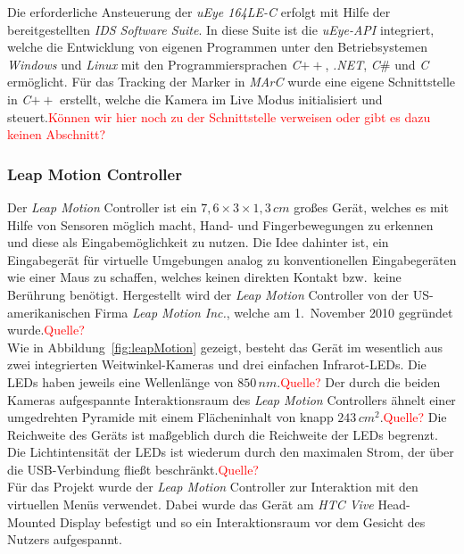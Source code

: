 Die erforderliche Ansteuerung der \textit{uEye 164LE-C} erfolgt mit Hilfe der bereitgestellten \textit{IDS Software Suite}. In diese Suite ist die \textit{uEye-API} integriert, welche die Entwicklung von eigenen Programmen unter den Betriebsystemen \textit{Windows} und \textit{Linux} mit den Programmiersprachen \textit{C}$++$, \textit{.NET}, \textit{C$\#$} und \textit{C} ermöglicht.\cite{website:IDSSuite} Für das Tracking der Marker in \textit{MArC} wurde eine eigene Schnittstelle in \textit{C}$++$ erstellt, welche die Kamera im Live Modus initialisiert und steuert.\textcolor{red}{Können wir hier noch zu der Schnittstelle verweisen oder gibt es dazu keinen Abschnitt?}

\subsubsection{Leap Motion Controller}\label{sec:LeapMotion} 	
Der \textit{Leap Motion} Controller \cite{website:LeapMotion} ist ein $7,6\times3\times1,3\,cm$ großes Gerät, welches es mit Hilfe von Sensoren möglich macht, Hand- und Fingerbewegungen zu erkennen und diese als Eingabemöglichkeit zu nutzen. Die Idee dahinter ist, ein Eingabegerät für virtuelle Umgebungen analog zu konventionellen Eingabegeräten wie einer Maus zu schaffen, welches keinen direkten Kontakt bzw.\ keine Berührung benötigt. Hergestellt wird der \textit{Leap Motion} Controller von der US-amerikanischen Firma \emph{Leap Motion Inc.}, welche am 1.\ November 2010 gegründet wurde.\textcolor{red}{Quelle?}\\
Wie in Abbildung~\ref{fig:leapMotion} gezeigt, besteht das Gerät im wesentlich aus zwei integrierten Weitwinkel-Kameras und drei einfachen Infrarot-LEDs. Die LEDs haben jeweils eine Wellenlänge von $850\,nm$.\textcolor{red}{Quelle?} Der durch die beiden Kameras aufgespannte Interaktionsraum des \textit{Leap Motion} Controllers ähnelt einer umgedrehten Pyramide mit einem Flächeninhalt von knapp $243\,cm{^2}$.\textcolor{red}{Quelle?} Die Reichweite des Geräts ist maßgeblich durch die Reichweite der LEDs begrenzt. Die Lichtintensität der LEDs ist wiederum durch den maximalen Strom, der über die USB-Verbindung fließt beschränkt.\textcolor{red}{Quelle?}\\
Für das Projekt wurde der \textit{Leap Motion} Controller zur Interaktion mit den virtuellen Menüs verwendet. Dabei wurde das Gerät am \textit{HTC Vive} Head-Mounted Display befestigt und so ein Interaktionsraum vor dem Gesicht des Nutzers aufgespannt.

